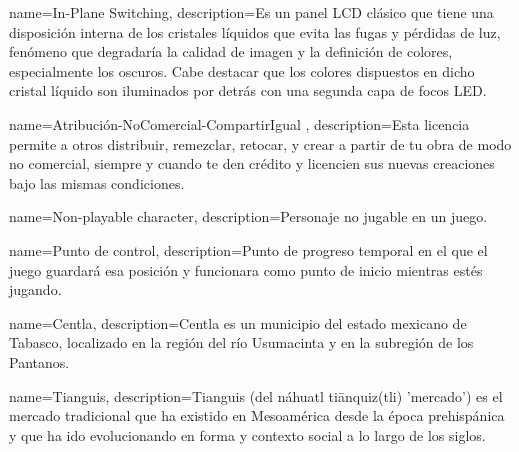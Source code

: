 

{
	name={In-Plane Switching},
	description={Es un panel LCD clásico que tiene una disposición interna de los cristales líquidos que evita las fugas y pérdidas de luz, fenómeno que degradaría la calidad de imagen y la definición de colores, especialmente los oscuros. Cabe destacar que los colores dispuestos en dicho cristal líquido son iluminados por detrás con una segunda capa de focos LED.}
}

{
	name={Atribución-NoComercial-CompartirIgual },
	description={Esta licencia permite a otros distribuir, remezclar, retocar, y crear a partir de tu obra de modo no comercial, siempre y cuando te den crédito y licencien sus nuevas creaciones bajo las mismas condiciones.}
}

{
	name={Non-playable character},
	description={Personaje no jugable en un juego.}
}

{
	name={Punto de control},
	description={Punto de progreso temporal en el que el juego guardará esa posición y funcionara como punto de inicio mientras estés jugando.}
}

{
	name={Centla},
	description={Centla es un municipio del estado mexicano de Tabasco, localizado en la región del río Usumacinta y en la subregión de los Pantanos.}
}

{
	name={Tianguis},
	description={Tianguis (del náhuatl tiānquiz(tli) 'mercado') es el mercado tradicional que ha existido en Mesoamérica desde la época prehispánica y que ha ido evolucionando en forma y contexto social a lo largo de los siglos.}
}


